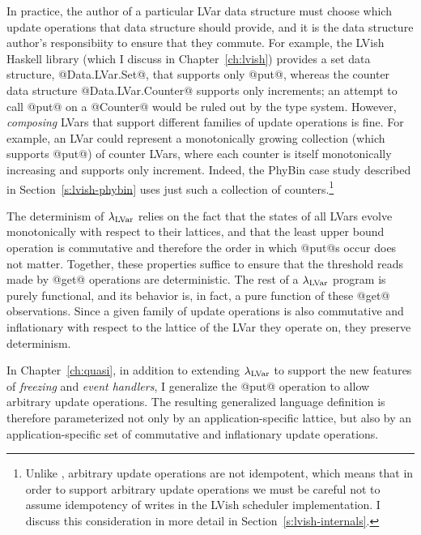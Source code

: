 In practice, the author of a particular LVar data structure must
choose which update operations that data structure should provide, and
it is the data structure author's responsibiity to ensure that they
commute.  For example, the LVish Haskell library (which I discuss in
Chapter~\ref{ch:lvish}) provides a set data structure,
@Data.LVar.Set@, that supports only @put@, whereas the counter data
structure @Data.LVar.Counter@ supports only increments; an attempt to
call @put@ on a @Counter@ would be ruled out by the type system.
However, \emph{composing} LVars that support different families of
update operations is fine.  For example, an LVar could represent a
monotonically growing collection (which supports @put@) of counter
LVars, where each counter is itself monotonically increasing and
supports only increment.  Indeed, the PhyBin case study described in
Section~\ref{s:lvish-phybin} uses just such a collection of
counters.\footnote{Unlike , arbitrary update operations are
  not idempotent, which means that in order to support arbitrary
  update operations we must be careful not to assume idempotency of
  writes in the LVish scheduler implementation.  I discuss this
  consideration in more detail in Section~\ref{s:lvish-internals}.}

The determinism of $\lambda_{\textrm{LVar}}$ relies on the fact that the states of
all LVars evolve monotonically with respect to their lattices, and
that the least upper bound operation is commutative and therefore the
order in which @put@s occur does not matter.  Together, these
properties suffice to ensure that the threshold reads made by @get@
operations are deterministic. The rest of a $\lambda_{\textrm{LVar}}$ program is
purely functional, and its behavior is, in fact, a pure function of
these @get@ observations.  Since a given family of update operations
is also commutative and inflationary with respect to the lattice of
the LVar they operate on, they preserve determinism.

In Chapter~\ref{ch:quasi}, in addition to extending $\lambda_{\textrm{LVar}}$ to
support the new features of \emph{freezing} and \emph{event handlers},
I generalize the @put@ operation to allow arbitrary update operations.
The resulting generalized language definition is therefore
parameterized not only by an application-specific lattice, but also by
an application-specific set of commutative and inflationary update
operations.



